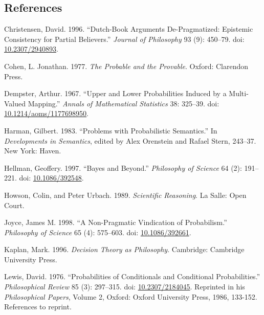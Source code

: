 \documentclass[
  11pt,
  letterpaper,
  DIV=11,
  numbers=noendperiod,
  twoside]{scrartcl}
\newlength{\cslhangindent}
\newenvironment{CSLReferences}[2] %
 {\begin{list}{}{%
  \setlength{\itemindent}{0pt}
  \setlength{\leftmargin}{0pt}
  \setlength{\parsep}{0pt}
  \ifodd #1
   \setlength{\leftmargin}{\cslhangindent}
   \setlength{\itemindent}{-1\cslhangindent}
  \fi
  \setlength{\itemsep}{#2\baselineskip}}}
 {\end{list}}
\begin{document}
\subsection*{References}\label{references}

\label{refs}
\begin{CSLReferences}{1}{0}
Christensen, David. 1996. {``Dutch-Book Arguments {D}e-Pragmatized:
Epistemic Consistency for Partial Believers.''} \emph{Journal of
Philosophy} 93 (9): 450--79. doi:
\href{https://doi.org/10.2307/2940893}{10.2307/2940893}.

Cohen, L. Jonathan. 1977. \emph{The Probable and the Provable}. Oxford:
Clarendon Press.

Dempster, Arthur. 1967. {``Upper and Lower Probabilities Induced by a
Multi-Valued Mapping.''} \emph{Annals of Mathematical Statistics} 38:
325--39. doi:
\href{https://doi.org/10.1214/aoms/1177698950}{10.1214/aoms/1177698950}.

Harman, Gilbert. 1983. {``Problems with Probabilistic Semantics.''} In
\emph{Developments in Semantics}, edited by Alex Orenstein and Rafael
Stern, 243--37. New York: Haven.

Hellman, Geoffery. 1997. {``Bayes and Beyond.''} \emph{Philosophy of
Science} 64 (2): 191--221. doi:
\href{https://doi.org/10.1086/392548}{10.1086/392548}.

Howson, Colin, and Peter Urbach. 1989. \emph{Scientific Reasoning}. La
Salle: Open Court.

Joyce, James M. 1998. {``A Non-Pragmatic Vindication of Probabilism.''}
\emph{Philosophy of Science} 65 (4): 575--603. doi:
\href{https://doi.org/10.1086/392661}{10.1086/392661}.

Kaplan, Mark. 1996. \emph{Decision Theory as Philosophy}. Cambridge:
Cambridge University Press.

Lewis, David. 1976. {``Probabilities of Conditionals and Conditional
Probabilities.''} \emph{Philosophical Review} 85 (3): 297--315. doi:
\href{https://doi.org/10.2307/2184045}{10.2307/2184045}. Reprinted in
his \emph{Philosophical Papers}, Volume 2, Oxford: Oxford University
Press, 1986, 133-152. References to reprint.


\end{CSLReferences}
\end{document}

